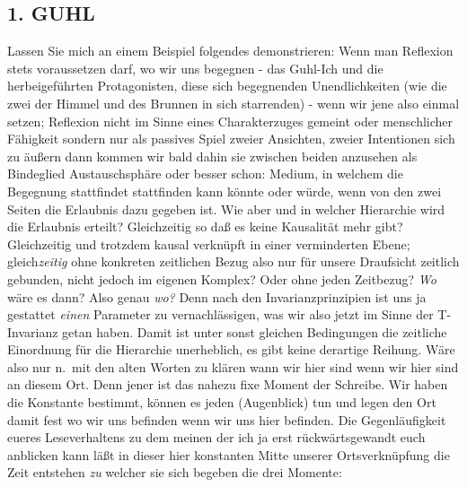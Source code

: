 \documentclass[
]{article}
\author{}
\date{\vspace{-2.5em}}
\begin{document}
\subsection{1. GUHL}\label{guhl}

Lassen Sie mich an einem Beispiel folgendes demonstrieren: Wenn man
Reflexion stets voraussetzen darf, wo wir uns begegnen - das Guhl-Ich
und die herbeigeführten Protagonisten, diese sich begegnenden
Unendlichkeiten (wie die zwei der Himmel und des Brunnen in sich
starrenden) - wenn wir jene also einmal setzen; Reflexion nicht im Sinne
eines Charakterzuges gemeint oder menschlicher Fähigkeit sondern nur als
passives Spiel zweier Ansichten, zweier Intentionen sich zu äußern dann
kommen wir bald dahin sie zwischen beiden anzusehen als Bindeglied
Austauschsphäre oder besser schon: Medium, in welchem die Begegnung
stattfindet stattfinden kann könnte oder würde, wenn von den zwei Seiten
die Erlaubnis dazu gegeben ist. Wie aber und in welcher Hierarchie wird
die Erlaubnis erteilt? Gleichzeitig so daß es keine Kausalität mehr
gibt? Gleichzeitig und trotzdem kausal verknüpft in einer verminderten
Ebene; gleich\emph{zeitig} ohne konkreten zeitlichen Bezug also nur für
unsere Draufsicht zeitlich gebunden, nicht jedoch im eigenen Komplex?
Oder ohne jeden Zeitbezug? \emph{Wo} wäre es dann? Also genau \emph{wo?
}Denn nach den Invarianzprinzipien ist uns ja gestattet \emph{einen}
Parameter zu vernachlässigen, was wir also jetzt im Sinne der
T-Invarianz getan haben. Damit ist unter sonst gleichen Bedingungen die
zeitliche Einordnung für die Hierarchie unerheblich, es gibt keine
derartige Reihung. Wäre also nur n.~mit den alten Worten zu klären wann
wir hier sind wenn wir hier sind an diesem Ort. Denn jener ist das
nahezu fixe Moment der Schreibe. Wir haben die Konstante bestimmt,
können es jeden (Augenblick) tun und legen den Ort damit fest wo wir uns
befinden wenn wir uns hier befinden. Die Gegenläufigkeit eueres
Leseverhaltens zu dem meinen der ich ja erst rückwärtsgewandt euch
anblicken kann läßt in dieser hier konstanten Mitte unserer
Ortsverknüpfung die Zeit entstehen \emph{zu} welcher sie sich begeben
die drei Momente:
\end{document}
